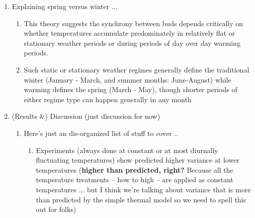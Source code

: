 \documentclass[11pt]{article}
\begin{document}
\begin{enumerate}
\begin{enumerate}
\begin{enumerate}
\item Using the simplest model---a thermal sum accumulation model, which is underlying model for many phenological events across plants and insects---we show how the pattern of temperatures predicts increasing variance with continued warming
\item Our main finding is that the linear increase of average temperatures, which is definitional to climatological `spring' months makes plants budburst at the same time, with variation between individuals negligible.  But as temperatures warm, budburst happens in the more stationary temperature regimes (where average temperatures do not increase) and small variations have a larger effect, resulting in the desynchronization of blooms or a scattered spring.
\end{enumerate}
\item by shifting phenological triggers (thresholds?) earlier into more stationary seasonal climate periods 
\end{enumerate}
\item Explaining spring versus winter ... 
\begin{enumerate}
\item This theory suggests the synchrony between buds depends critically on whether temperatures accumulate predominately in relatively flat or stationary weather periods or during periods of day over day warming periods. 
\item Such static or stationary weather regimes generally define the traditional winter  (January - March, and summer months: June-August) while warming defines the spring (March - May), though shorter periods of either regime type can happen generally in any month
\end{enumerate}
\item (Results \&) Discussion (just discussion for now)
\begin{enumerate}
\item Here's just an dis-organized list of stuff to cover .. 
\begin{enumerate}
\item Experiments (always done at constant or at most diurnally fluctuating temperatures) show predicted higher variance at lower temperatures ({\bf higher than predicted, right?} Because all the temperature treatments -- how to high -- are applied as constant temperatures ... but I think we're talking about variance that is more than predicted by the simple thermal model so we need to spell this out for folks)

\end{enumerate}
\end{enumerate}
\end{enumerate}
\end{document}

